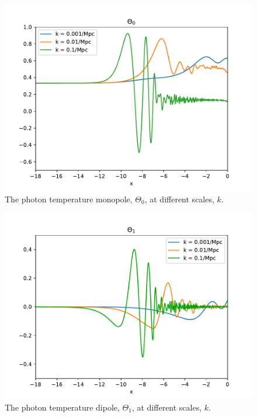 \documentclass{aa}
\begin{document}
\begin{figure}[h!]
   \includegraphics[scale=0.6]{../figures/milestone3/test_theta_0.pdf}
   \caption{The photon temperature monopole, $\Theta_0$, at different scales, $k$.}\label{fig:test3}
\end{figure}

\begin{figure}[h!]
   \includegraphics[scale=0.6]{../figures/milestone3/test_theta_1.pdf}
   \caption{The photon temperature dipole, $\Theta_1$, at different scales, $k$.}\label{fig:test4}
\end{figure}
\end{document}
